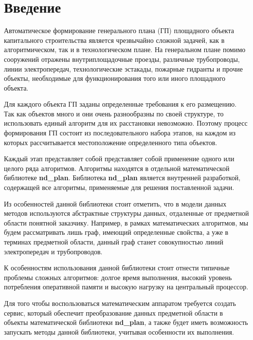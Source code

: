 \section*{\Large{Введение}}
Автоматическое формирование генерального плана (ГП) площадного объекта капитального строительства является чрезвычайно
сложной задачей, как в алгоритмическом, так и в технологическом плане.
На генеральном плане помимо сооружений отражены внутриплощадочные проезды, различные трубопроводы, линии электропередач,
технологические эстакады, пожарные гидранты и прочие объекты,
необходимые для функционирования того или иного площадного объекта.

Для каждого объекта ГП заданы определенные требования к его размещению.
Так как объектов много и они очень разнообразны по своей структуре,
то использовать единый алгоритм для их расстановки невозможно.
Поэтому процесс формирования ГП состоит из последовательного набора этапов, на каждом из которых
рассчитывается местоположение определенного типа объектов.

Каждый этап представляет собой представляет собой применение одного или целого ряда алгоритмов.
Алгоритмы находятся в отдельной математической библиотеке \textbf{nd\_plan}.
Библиотека \textbf{nd\_plan} является внутренней разработкой, содержащей все алгоритмы,
применяемые для решения поставленной задачи.

Из особенностей данной библиотеки стоит отметить, что в модели данных методов используются абстрактные
структуры данных, отдаленные от предметной области понятной заказчику. Например, в рамках
математических алгоритмов, мы будем рассматривать лишь граф, имеющий определенные свойства,
а уже в терминах предметной области, данный граф станет совокупностью линий электропередач и трубопроводов.

К особенностям использования данной библиотеки стоит отнести типичные проблемы сложных алгоритмов: долгое время
выполнения, высокий уровень потребления оперативной памяти и высокую нагрузку на центральный процессор.

Для того чтобы воспользоваться математическим аппаратом требуется создать сервис, который обеспечит преобразование
данных предметной области в объекты математической библиотеки \textbf{nd\_plan},
а также будет иметь возможность запускать методы данной библиотеки, учитывая особенности их выполнения.
